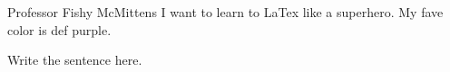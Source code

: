 \documentclass{article}
\begin{document}


\begin{flushright}
Professor Fishy McMittens
I want to learn to LaTex like a superhero.
My fave color is def purple.
\end{flushright}






Write the sentence here.


\end{document}
